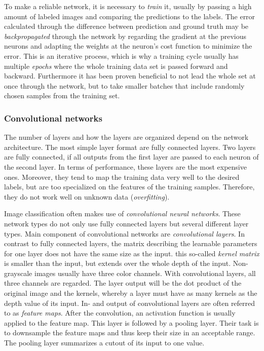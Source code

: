 \documentclass[11pt]{article}
\begin{document}
	To make a reliable network, it is necessary to \textit{train} it, usually by passing a high amount of labeled images and comparing the predictions to the labels. The error calculated through the difference between prediction and ground truth may be \textit{backpropagated} through the network by regarding the gradient at the previous neurons and adapting the weights at the neuron's cost function to minimize the error. This is an iterative process, which is why a training cycle usually has multiple \textit{epochs} where the whole training data set is passed forward and backward. Furthermore it has been proven beneficial to not lead the whole set at once through the network, but to take smaller batches that include randomly chosen samples from the training set. 
	
	\subsubsection{Convolutional networks}
	The number of layers and how the layers are organized depend on the network architecture. The most simple layer format are fully connected layers. Two layers are fully connected, if all outputs from the first layer are passed to each neuron of the second layer. In terms of performance, these layers are the most expensive ones. Moreover, they tend to map the training data very well to the desired labels, but are too specialized on the features of the training samples. Therefore, they do not work well on unknown data (\textit{overfitting}).
	
	Image classification often makes use of \textit{convolutional neural networks}. These network types do not only use fully connected layers but several different layer types. Main component of convolutional networks are \textit{convolutional layers}. In contrast to fully connected layers, the matrix describing the learnable parameters for one layer does not have the same size as the input. this so-called \textit{kernel matrix} is smaller than the input, but extends over the whole depth of the input. Non-grayscale images usually have three color channels. With convolutional layers, all three channels are regarded. The layer output will be the dot product of the original image and the kernels, whereby a layer must have as many kernels as the depth value of its input. In- and output of convolutional layers are often referred to as \textit{feature maps}. After the convolution, an activation function is usually applied to the feature map. This layer is followed by a pooling layer. Their task is to downsample the feature maps and thus keep their size in an acceptable range. The pooling layer summarizes a cutout of its input to one value. \cite{lecun2010}
	
\end{document}
